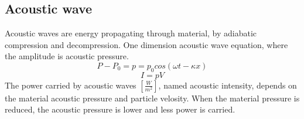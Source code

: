 \documentclass[\main/master.tex]{subfiles}
\begin{document}
\subsection{Acoustic wave}
Acoustic waves are energy propagating through material, by adiabatic compression and decompression. One dimension acoustic wave equation, where the amplitude is acoustic pressure.
\begin{equation}
P-P_0 = p = p_0cos(\omega t -\kappa x)       \label{eqn:acoustic_pressure}
\end{equation}
\begin{equation}
I = pV      \label{eqn:acoustic_intensity}
\end{equation} 
The power carried by acoustic waves $[\frac{W}{m^2}]$, named acoustic intensity, depends on the material acoustic pressure and particle velosity. When the material pressure is reduced, the acoustic pressure is lower and less power is carried.
\end{document}
